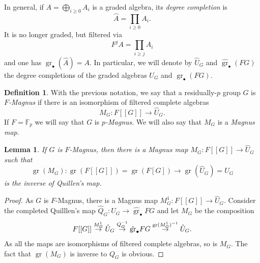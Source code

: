 \documentclass[10pt, oneside]{amsart}
\newcommand{\F}{\mathbb{F}}
\newcommand{\gr}{\operatorname{gr}} %
\newtheorem{lemma}[theorem]{Lemma}
\theoremstyle{definition}
\newtheorem{definition}[theorem]{Definition}
\theoremstyle{remark}
\theoremstyle{plain}
\begin{document}
In general, if $A=\bigoplus_{i\geq 0}A_i$ is a graded algebra, its {\sl degree completion} is
$$\hat{A}=\prod_{i\geq 0}A_i.$$
It is no longer graded, but filtered via
$$F^jA=\prod_{i\geq j}A_i$$
and one has $\gr_\bullet(\hat{A})=A$.
In particular, we will denote by $\hat{U}_G$ and $\hat{\gr}_\bullet(FG)$ the degree completions of  the graded algebras $U_G$ and ${\gr}_\bullet(FG)$.









\begin{definition}\label{def:filtered} With the previous notation, we say that a residually-$p$ group $G$ is {\sl $F$-Magnus} if there is an isomorphism of filtered complete algebras
$$M_G:F[[G]]\to\hat{U}_G.$$
If $F=\F_p$ we will say that $G$ is {\sl $p$-Magnus}. We will also say that $M_G$ is a {\sl Magnus map}.
\end{definition}

\begin{lemma} If $G$ is $F$-Magnus, then there is a Magnus map $M_G:F[[G]]\to\hat{U}_G$ such that
$$\gr(M_G):\gr(F[[G]])=\gr(F[G])\to\gr(\hat{U}_G)=U_G$$
    is the inverse of Quillen's map.
\end{lemma}
\begin{proof} As $G$ is $F$-Magnus, there is a Magnus map $M^1_G:F[[G]]\to\hat{U}_G$. Consider the completed Quilllen's map
$\hat{Q}_G:\hat{U}_G\to\hat{\gr}_\bullet FG$ and let $M_G$ be the composition
$$F[[G]]\buildrel{M^1_G}\over\to\hat{U}_G\buildrel{Q_G^{-1}}\over\to\hat{\gr}_\bullet FG\buildrel{\gr(M^1_G)^{-1}}\over\to\hat{U}_G.$$
As all the maps are isomorphisms of filtered complete algebras, so is $M_G$. The fact that $\gr(M_G)$ is inverse to $Q_G$ is obvious.
\end{proof}
\end{document}
